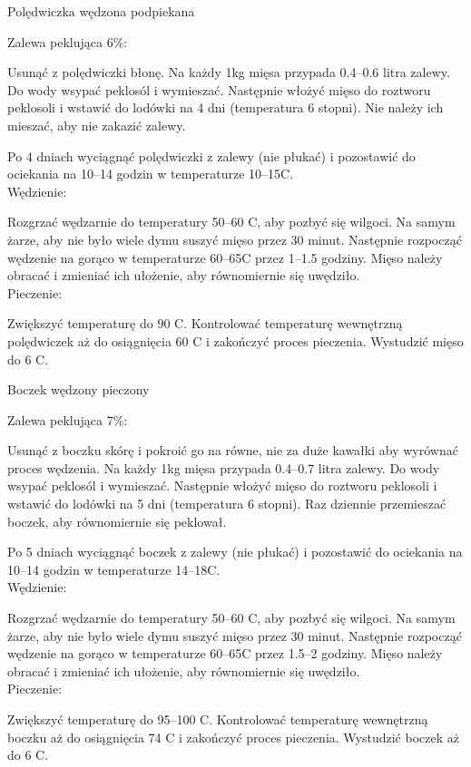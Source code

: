 \documentclass[a4paper,12pt]{article}
\begin{document}
\begin{recipe}{Polędwiczka wędzona podpiekana}{}{}

\freeform%
Zalewa peklująca 6\%:

\freeform%
Usunąć z polędwiczki błonę.
Na każdy 1kg mięsa przypada 0.4--0.6 litra zalewy.
Do wody wsypać peklosól i wymieszać.
Następnie włożyć mięso do roztworu peklosoli i wstawić do lodówki na 4 dni (temperatura 6 stopni). 
Nie należy ich mieszać, aby nie zakazić zalewy.

Po 4 dniach wyciągnąć polędwiczki z zalewy (nie płukać) i pozostawić do ociekania na 10--14 godzin w temperaturze 10--15\0C. \\

Wędzienie:

Rozgrzać wędzarnie do temperatury 50--60 \0C, aby pozbyć się wilgoci.
Na samym żarze, aby nie było wiele dymu suszyć mięso przez 30 minut.
Następnie rozpocząć wędzenie na gorąco w temperaturze 60--65\0C przez 1--1.5 godziny. 
Mięso należy obracać i zmieniać ich ułożenie, aby równomiernie się uwędziło. \\

Pieczenie:

Zwiększyć temperaturę do 90 \0C. 
Kontrolować temperaturę wewnętrzną polędwiczek aż do osiągnięcia 60 \0C i zakończyć proces pieczenia.
Wystudzić mięso do 6 \0C.

\newpage 

\end{recipe}


\begin{recipe}{Boczek wędzony pieczony}{}{}

\freeform%
Zalewa peklująca 7\%:

Usunąć z boczku skórę i pokroić go na równe, nie za duże kawałki aby wyrównać proces wędzenia.
\freeform%
Na każdy 1kg mięsa przypada 0.4--0.7 litra zalewy.
Do wody wsypać peklosól i wymieszać.
Następnie włożyć mięso do roztworu peklosoli i wstawić do lodówki na 5 dni (temperatura 6 stopni). 
Raz dziennie przemieszać boczek, aby równomiernie się peklował.

Po 5 dniach wyciągnąć boczek z zalewy (nie płukać) i pozostawić do ociekania na 10--14 godzin w temperaturze 14--18\0C. \\

Wędzienie:

Rozgrzać wędzarnie do temperatury 50--60 \0C, aby pozbyć się wilgoci.
Na samym żarze, aby nie było wiele dymu suszyć mięso przez 30 minut.
Następnie rozpocząć wędzenie na gorąco w temperaturze 60--65\0C przez 1.5--2 godziny. 
Mięso należy obracać i zmieniać ich ułożenie, aby równomiernie się uwędziło. \\

Pieczenie:

Zwiększyć temperaturę do 95--100 \0C. 
Kontrolować temperaturę wewnętrzną boczku aż do osiągnięcia 74 \0C i zakończyć proces pieczenia.
Wystudzić boczek aż do 6 \0C.

\end{recipe}
\end{document}
